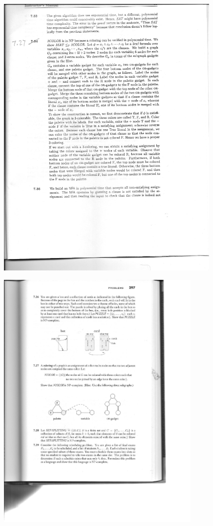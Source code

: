 \documentclass[12pt,fullpage]{article}
\begin{document}

\newpage \hspace*{4cm}{\bf \large Appendix: Reducing 3-SAT to 3-GC}

\vspace{0.5cm}

\begin{center}
\begin{figure}[h]
\hspace*{4cm}\includegraphics[width=11cm]{proseSAT3Col.pdf}
\end{figure}
\end{center}

\begin{center}
\begin{figure}[h]
\hspace*{4cm}\includegraphics[width=10cm]{figColSAT.pdf}
\end{figure}
\end{center}
\end{document}
